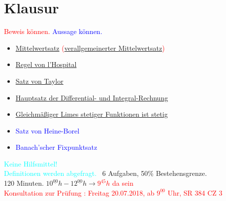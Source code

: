 \section*{Klausur}
\textcolor{red}{Beweis können.}
\textcolor{blue}{Aussage können.}
\begin{itemize}
	\item \textcolor{red}{\hyperref[vl_07_MWS]{Mittelwertsatz} (\hyperref[satz_9]{verallgemeinerter Mittelwertsatz})}
	\item \textcolor{blue}{\hyperref[regel_von_hospital]{Regel von l'Hospital}}
	\item \textcolor{red}{\hyperref[satz_von_taylor]{Satz von Taylor}}
	\item \textcolor{red}{\hyperref[vl_12_satz_01]{Hauptsatz der Differential- und Integral-Rechnung}}
	\item \textcolor{red}{\hyperref[def:glm_konv]{Gleichmäßiger Limes stetiger Funktionen ist stetig}}
	\item \textcolor{blue}{Satz von Heine-Borel}
	\item \textcolor{blue}{Banach'scher Fixpunktsatz}
\end{itemize}
\textcolor{cyan}{Keine Hilfsmittel!}\\
\textcolor{cyan}{Definitionen werden abgefragt.}
~6 Aufgaben, 50\% Bestehensgrenze.\\
120 Minuten. $10^{\underline{00}}h - 12^{\underline{00}}h \rightarrow$\textcolor{red}{$9^{\underline{45}}h$ da sein}\\

\textcolor{red}{Konsultation zur Prüfung : Freitag 20.07.2018, 
ab $9^{\underline{00}}$ Uhr, SR 384 CZ 3}